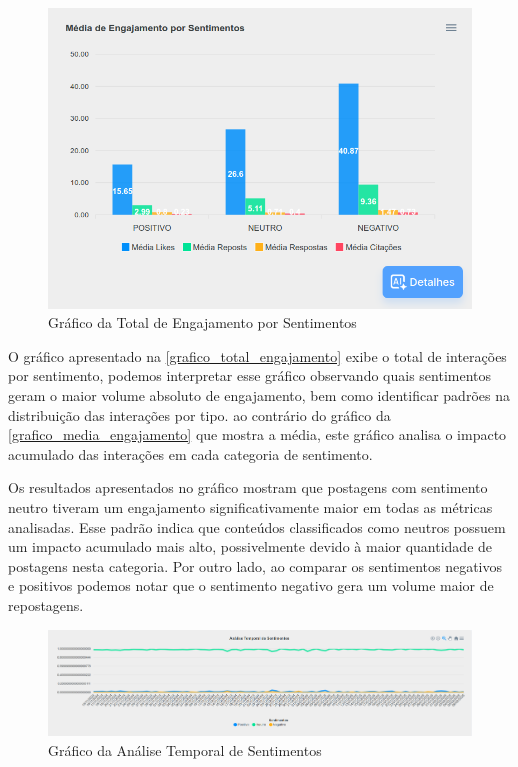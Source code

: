 \documentclass[
	12pt,				%
	oneside,			%
	a4paper,			%
	english,			%
	french,				%
	spanish,			%
	brazil				%
	]{abntex2}
\begin{document}
\begin{figure}[htbp]
\hypertarget{grafico_total_engajamento}{%
\caption{Gráfico da Total de Engajamento por Sentimentos}\label{grafico_total_engajamento}
\begin{center}
\includegraphics[scale=0.3]{imagens/sentilytics/estudo-caso/media_engajamento_por_sentimento.png}
\end{center}
}
\end{figure}

O gráfico apresentado na \autoref{grafico_total_engajamento} exibe o
total de interações por sentimento, podemos interpretar esse gráfico
observando quais sentimentos geram o maior volume absoluto de
engajamento, bem como identificar padrões na distribuição das interações
por tipo. ao contrário do gráfico da \autoref{grafico_media_engajamento}
que mostra a média, este gráfico analisa o impacto acumulado das
interações em cada categoria de sentimento.

Os resultados apresentados no gráfico mostram que postagens com
sentimento neutro tiveram um engajamento significativamente maior em
todas as métricas analisadas. Esse padrão indica que conteúdos
classificados como neutros possuem um impacto acumulado mais alto,
possivelmente devido à maior quantidade de postagens nesta categoria.
Por outro lado, ao comparar os sentimentos negativos e positivos podemos
notar que o sentimento negativo gera um volume maior de repostagens.

\begin{figure}[htbp]
\hypertarget{grafico_analise_temporal}{%
\caption{Gráfico da Análise Temporal de Sentimentos}\label{grafico_analise_temporal}
\begin{center}
\includegraphics[scale=0.26]{imagens/sentilytics/estudo-caso/analise_temporal_sentimentos.png}
\end{center}
}
\end{figure}
\end{document}
